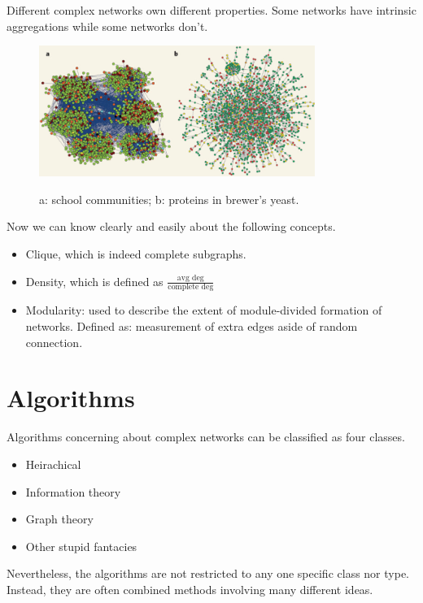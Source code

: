 \documentclass[UTF8, 11pt, a4paper]{ctexart}
\begin{document}
Different complex networks own different properties. Some networks have intrinsic aggregations while some networks don't.

\begin{figure}[H]
	\centering
	\includegraphics[width=0.80\textwidth]{assort_disassort}
	\caption{}
	a: school communities; b: proteins in brewer's yeast.
\end{figure}

Now we can know clearly and easily about the following concepts.

\begin{itemize}
\item Clique, which is indeed complete subgraphs.
\item Density, which is defined as $\frac{\text{avg deg}}{\text{complete deg}}$
\item Modularity: used to describe the extent of module-divided formation of networks.
Defined as: measurement of extra edges aside of random connection.
\end{itemize}



\section{Algorithms}

Algorithms concerning about complex networks can be classified as four classes.

\begin{itemize}
\item Heirachical
\item Information theory
\item Graph theory
\item Other stupid fantacies
\end{itemize}

Nevertheless, the algorithms are not restricted to any one specific class nor type. Instead, they are often combined methods involving many different ideas.
\end{document}

